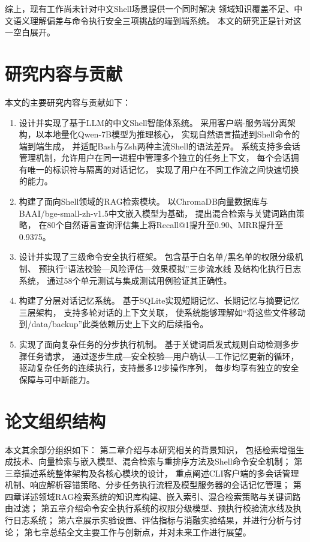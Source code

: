 综上，现有工作尚未针对中文Shell场景提供一个同时解决
领域知识覆盖不足、中文语义理解偏差与命令执行安全三项挑战的端到端系统。
本文的研究正是针对这一空白展开。

\section{研究内容与贡献}

本文的主要研究内容与贡献如下：

\begin{enumerate}
    \item 设计并实现了基于LLM的中文Shell智能体系统。
    采用客户端-服务端分离架构，以本地量化Qwen-7B模型为推理核心，
    实现自然语言描述到Shell命令的端到端生成，
    并适配Bash与Zsh两种主流Shell的语法差异。
    系统支持多会话管理机制，允许用户在同一进程中管理多个独立的任务上下文，
    每个会话拥有唯一的标识符与隔离的对话记忆，
    实现了用户在不同工作流之间快速切换的能力。

    \item 构建了面向Shell领域的RAG检索模块。
    以ChromaDB向量数据库与BAAI/bge-small-zh-v1.5中文嵌入模型为基础，
    提出混合检索与关键词路由策略，
    在80个自然语言查询评估集上将Recall@1提升至0.90、MRR提升至0.9375。

    \item 设计并实现了三级命令安全执行框架。
    包含基于白名单/黑名单的权限分级机制、
    预执行“语法校验—风险评估—效果模拟”三步流水线
    及结构化执行日志系统，
    通过58个单元测试与集成测试用例验证其正确性。

    \item 构建了分层对话记忆系统。
    基于SQLite实现短期记忆、长期记忆与摘要记忆三层架构，
    支持多轮对话的上下文关联，
    使系统能够理解如“将这些文件移动到/data/backup”此类依赖历史上下文的后续指令。

    \item 实现了面向复杂任务的分步执行机制。
    基于关键词启发式规则自动检测多步骤任务请求，
    通过逐步生成—安全校验—用户确认—工作记忆更新的循环，
    驱动复杂任务的连续执行，支持最多12步操作序列，
    每步均享有独立的安全保障与可中断能力。
\end{enumerate}

\section{论文组织结构}

本文其余部分组织如下：
第二章介绍与本研究相关的背景知识，
包括检索增强生成技术、向量检索与嵌入模型、混合检索与重排序方法及Shell命令安全机制；
第三章描述系统整体架构及各核心模块的设计，
重点阐述CLI客户端的多会话管理机制、响应解析容错策略、分步任务执行流程及模型服务器的会话记忆管理；
第四章详述领域RAG检索系统的知识库构建、嵌入索引、混合检索策略与关键词路由过滤；
第五章介绍命令安全执行系统的权限分级模型、预执行校验流水线及执行日志系统；
第六章展示实验设置、评估指标与消融实验结果，并进行分析与讨论；
第七章总结全文主要工作与创新点，并对未来工作进行展望。

